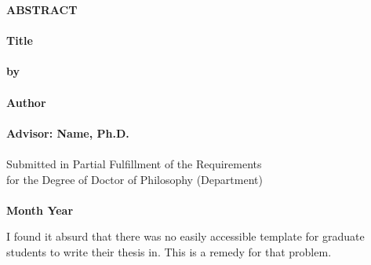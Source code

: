 
 {
 \begin{center}
{\large
{\bf ABSTRACT} \\
\mbox{} \\
{\bf Title}\\
\mbox{} \\
{\bf by} \\
\vspace{6pt}
\mbox{} \\
{\bf Author}\\
\mbox{} \\
{\bf Advisor: Name, Ph.D.}\\
\mbox{} \\
Submitted in Partial Fulfillment of the Requirements \\
\vspace{7pt}
for the Degree of Doctor of Philosophy (Department)}\\
\mbox{} \\
{\bf Month Year}
\end{center}
}
I found it absurd that there was no easily accessible template for graduate students to write their thesis in. This is a remedy for that problem.
